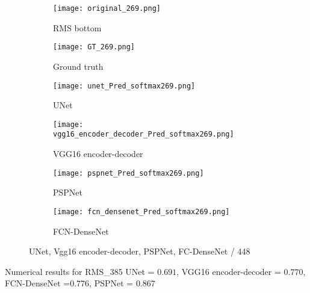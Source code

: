 	\begin{figure} [!h]
		\centering
		\begin{subfigure}[b]{0.47\textwidth}
			\centering
			\texttt{[image: original\_269.png]}
			\caption{RMS bottom}
			\label{fig:RMS_flat_shell_Vz_448}
		\end{subfigure}
		\hfill
		\begin{subfigure}[b]{0.47\textwidth}
			\centering
			\texttt{[image: GT\_269.png]}
			\caption{Ground truth}
			\label{fig:m1_rand_single_delam_448}
		\end{subfigure}
		\begin{subfigure}[b]{0.47\textwidth}
			\centering
			\texttt{[image: unet\_Pred\_softmax269.png]}
			\caption{UNet}
			\label{fig:unet_pred_448}
		\end{subfigure}
		\hfill
		\begin{subfigure}[b]{0.47\textwidth}
			\centering
			\texttt{[image: vgg16\_encoder\_decoder\_Pred\_softmax269.png]}
			\caption{VGG16 encoder-decoder}
			\label{fig:vgg16_pred_448}
		\end{subfigure}
		\hfill
		\begin{subfigure}[b]{0.47\textwidth}
			\centering
			\texttt{[image: pspnet\_Pred\_softmax269.png]}
			\caption{PSPNet}
			\label{fig:pspnet_pred_448}
		\end{subfigure}
		\hfill
		\begin{subfigure}[b]{0.47\textwidth}
			\centering
			\texttt{[image: fcn\_densenet\_Pred\_softmax269.png]}
			\caption{FCN-DenseNet}
			\label{fig:fcn_densenet_pred_448}
		\end{subfigure}
		\caption{UNet, Vgg16 encoder-decoder, PSPNet, FC-DenseNet /  448}
		\label{fig:softmax_448}
	\end{figure} 

Numerical results for RMS\_385
UNet = \(0.691\), VGG16 encoder-decoder = \(0.770\), FCN-DenseNet =\(0.776\), PSPNet = \(0.867\)

